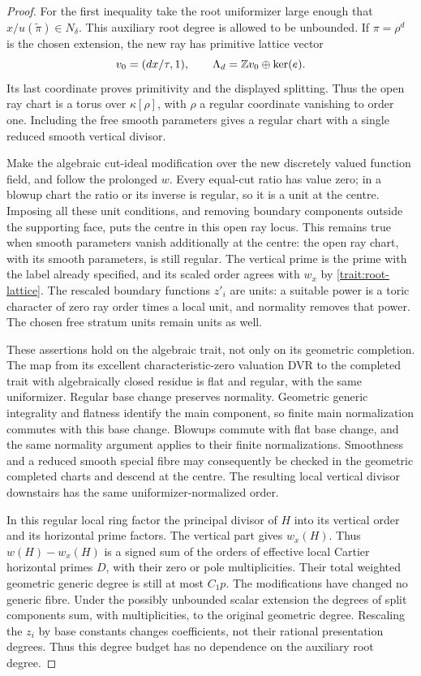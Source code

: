 \begin{proof}
For the first inequality take the root uniformizer
large enough that
\(x/u(\widetilde\pi)\in N_\delta\).  This auxiliary
root degree is allowed to be unbounded.  If
\(\pi=\rho^d\) is the chosen extension, the new ray
has primitive lattice vector
\begin{equation}
 v_0=(dx/\tau,1),\qquad
 \Lambda_d=\mathbb Z v_0\oplus\ker(e).
 \label{trait:reduced-ray}
\end{equation}
Its last coordinate proves primitivity and the displayed
splitting.  Thus the open ray chart is a torus over
\(\kappa[\rho]\), with \(\rho\) a regular coordinate
vanishing to order one.  Including the free smooth
parameters gives a regular chart with a single reduced
smooth vertical divisor.

Make the algebraic cut-ideal modification over the new
discretely valued function field, and follow the
prolonged \(w\).  Every equal-cut ratio has value zero;
in a blowup chart the ratio or its inverse is regular,
so it is a unit at the centre.  Imposing all these
unit conditions, and removing boundary components
outside the supporting face, puts the centre in this
open ray locus.  This remains true when smooth
parameters vanish additionally at the centre: the
open ray chart, with its smooth parameters, is still
regular.  The vertical prime is the prime with the
label already specified, and its scaled order agrees
with \(w_x\) by \eqref{trait:root-lattice}.  The rescaled
boundary functions \(z'_i\) are units: a suitable
power is a toric character of zero ray order times a
local unit, and normality removes that power.  The
chosen free stratum units remain units as well.

These assertions hold on the algebraic trait, not only
on its geometric completion.  The map from its
excellent characteristic-zero valuation DVR to the
completed trait with algebraically closed residue is
flat and regular, with the same uniformizer.  Regular
base change preserves normality.  Geometric generic
integrality and flatness identify the main component,
so finite main normalization commutes with this base
change.  Blowups commute with flat base change, and
the same normality argument applies to their finite
normalizations.  Smoothness and a reduced smooth
special fibre may consequently be checked in the
geometric completed charts and descend at the centre.
The resulting local vertical divisor downstairs has
the same uniformizer-normalized order.

In this regular local ring factor the principal
divisor of \(H\) into its vertical order and its
horizontal prime factors.  The vertical part gives
\(w_x(H)\).  Thus \(w(H)-w_x(H)\) is a signed sum of
the orders of effective local Cartier horizontal
primes \(D\), with their zero or pole multiplicities.
Their total weighted geometric generic degree is
still at most \(C_1p\).  The modifications have
changed no generic fibre.  Under the possibly
unbounded scalar extension the degrees of split
components sum, with multiplicities, to the original
geometric degree.  Rescaling the \(z_i\) by base
constants changes coefficients, not their rational
presentation degrees.  Thus this degree budget has
no dependence on the auxiliary root degree.


\end{proof}
